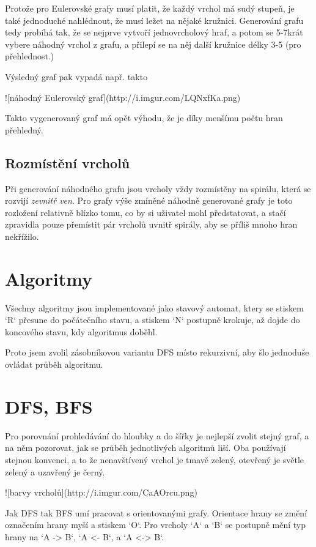 \documentclass{article}
\begin{document}
Protože pro Eulerovské grafy musí platit, že každý vrchol má sudý
stupeň, je také jednoduché nahlédnout, že musí ležet na nějaké kružnici.
Generování grafu tedy probíhá tak, že se nejprve vytvoří jednovrcholový
hraf, a potom se 5-7krát vybere náhodný vrchol z grafu, a přilepí se na
něj další kružnice délky 3-5 (pro přehlednost.)

Výsledný graf pak vypadá např. takto

![náhodný Eulerovský graf](http://i.imgur.com/LQNxfKa.png)

Takto vygenerovaný graf má opět výhodu, že je díky menšímu počtu hran přehledný.

\subsection{Rozmístění vrcholů}

Při generování náhodného grafu jsou vrcholy vždy rozmístěny na spirálu,
která se rozvijí \emph{zevnitř ven}. Pro grafy výše zmíněné náhodně
generované grafy je toto rozložení relativně blízko tomu, co by si
uživatel mohl předstatovat, a stačí zpravidla pouze přemístit pár
vrcholů uvnitř spirály, aby se příliš mnoho hran nekřížilo.

\section{Algoritmy}

Všechny algoritmy jsou implementované jako stavový automat, ktery se
stiskem `R` přesune do počátečního stavu, a stiskem `N` postupně
krokuje, až dojde do koncového stavu, kdy algoritmus doběhl.

Proto jsem zvolil zásobníkovou variantu DFS místo rekurzivní, aby šlo
jednoduše ovládat průběh algoritmu.

\section{DFS, BFS}

Pro porovnání prohledávání do hloubky a do šířky je nejlepší zvolit
stejný graf, a na něm pozorovat, jak se průběh jednotlivých algoritmů
liší. Oba používají stejnou konvenci, a to že nenavštívený vrchol je
tmavě zelený, otevřený je světle zelený a uzavřený je černý.

![barvy vrcholů](http://i.imgur.com/CaAOrcu.png)

Jak DFS tak BFS umí pracovat s orientovanými grafy. Orientace hrany se
změní označením hrany myší a stiskem `O`. Pro vrcholy `A` a `B` se
postupně mění typ hrany na `A -> B`, `A <- B`, a `A <-> B`.
\end{document}
